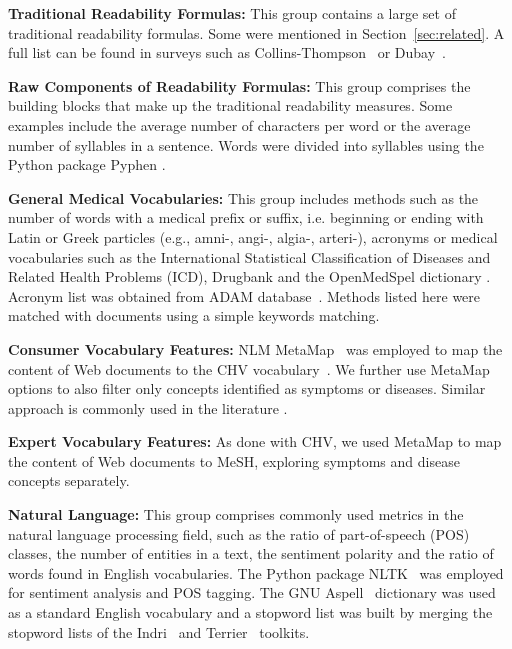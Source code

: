 \textbf{Traditional Readability Formulas:}
This group contains a large set of traditional readability formulas. Some were mentioned in Section~\ref{sec:related}. A full list can be found in surveys such as Collins-Thompson~\cite{collins2014computational} or Dubay~\cite{dubay04}.

\textbf{Raw Components of Readability Formulas:}
This group comprises the building blocks that make up the traditional readability measures. Some examples include the average number of characters per word or the average number of syllables in a sentence. Words were divided into syllables using the Python package Pyphen \cite{pyphen}.

\textbf{General Medical Vocabularies:}
This group includes methods such as the number of words with a medical prefix or suffix, i.e. beginning or ending with Latin or Greek particles (e.g., amni-, angi-, algia-, arteri-), acronyms or medical vocabularies such as the International Statistical Classification of Diseases and Related Health Problems (ICD), Drugbank and the OpenMedSpel dictionary \cite{openmedspel}.
Acronym list was obtained from ADAM database~\cite{zhou2006}. Methods listed here were matched with documents using a simple keywords matching.

\textbf{Consumer Vocabulary Features:}
NLM MetaMap~\cite{aronson10} was employed to map the content of Web documents to the CHV vocabulary~\cite{zeng06}.
We further use MetaMap options to also filter only concepts identified as symptoms or diseases.
Similar approach is commonly used in the literature \cite{} .

\textbf{Expert Vocabulary Features:}
As done with CHV, we used MetaMap to map the content of Web documents to MeSH, exploring symptoms and disease concepts separately. 

\textbf{Natural Language:}
This group comprises commonly used metrics in the natural language processing field, such as the ratio of part-of-speech (POS) classes, the number of entities in a text, the sentiment polarity and the ratio of words found in English vocabularies. The Python package NLTK~\cite{nltk} was employed for sentiment analysis and POS tagging. The GNU Aspell~\cite{aspell} dictionary was used as a standard English vocabulary and a stopword list was built by merging the stopword
lists of the Indri~\cite{indri} and Terrier~\cite{terrier} toolkits. 

